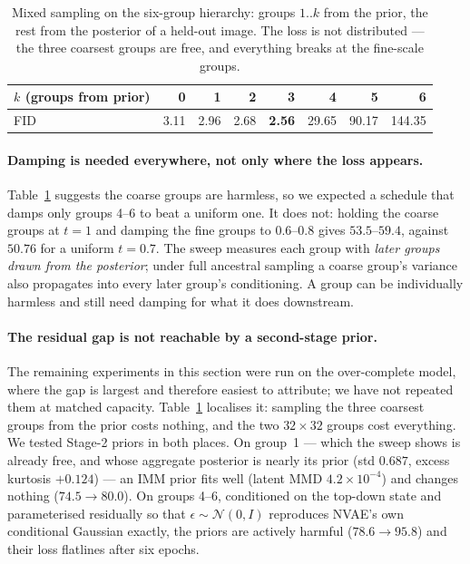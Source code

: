 \documentclass[sigconf,nonacm]{acmart}
\newcommand{\best}[1]{\textbf{#1}}
\begin{document}
\begin{table}[t]
\caption{Mixed sampling on the six-group hierarchy: groups $1..k$ from the
prior, the rest from the posterior of a held-out image. The loss is not
distributed --- the three coarsest groups are free, and everything breaks at the
fine-scale groups.}
\label{tab:mixed}
\small
\begin{tabular}{lrrrrrrr}
\toprule
$k$ (groups from prior) & 0 & 1 & 2 & 3 & 4 & 5 & 6 \\
\midrule
FID & 3.11 & 2.96 & 2.68 & \best{2.56} & 29.65 & 90.17 & 144.35 \\
\bottomrule
\end{tabular}
\end{table}

\paragraph{Damping is needed everywhere, not only where the loss appears.}
Table~\ref{tab:mixed} suggests the coarse groups are harmless, so we expected a
schedule that damps only groups 4--6 to beat a uniform one. It does not:
holding the coarse groups at $t{=}1$ and damping the fine groups to
$0.6$--$0.8$ gives $53.5$--$59.4$, against $50.76$ for a uniform $t{=}0.7$. The
sweep measures each group with \emph{later groups drawn from the posterior};
under full ancestral sampling a coarse group's variance also propagates into
every later group's conditioning. A group can be individually harmless and
still need damping for what it does downstream.

\paragraph{The residual gap is not reachable by a second-stage prior.}
The remaining experiments in this section were run on the over-complete model,
where the gap is largest and therefore easiest to attribute; we have not
repeated them at matched capacity. Table~\ref{tab:mixed} localises it: sampling the three coarsest groups from the
prior costs nothing, and the two $32{\times}32$ groups cost everything. We
tested Stage-2 priors in both places. On group~1 --- which the sweep shows is
already free, and whose aggregate posterior is nearly its prior (std $0.687$,
excess kurtosis $+0.124$) --- an IMM prior fits well (latent MMD $4.2\times
10^{-4}$) and changes nothing ($74.5 \to 80.0$). On groups 4--6, conditioned on
the top-down state and parameterised residually so that $\epsilon \sim
\mathcal{N}(0,I)$ reproduces NVAE's own conditional Gaussian exactly, the priors
are actively harmful ($78.6 \to 95.8$) and their loss flatlines after six
epochs.
\end{document}
